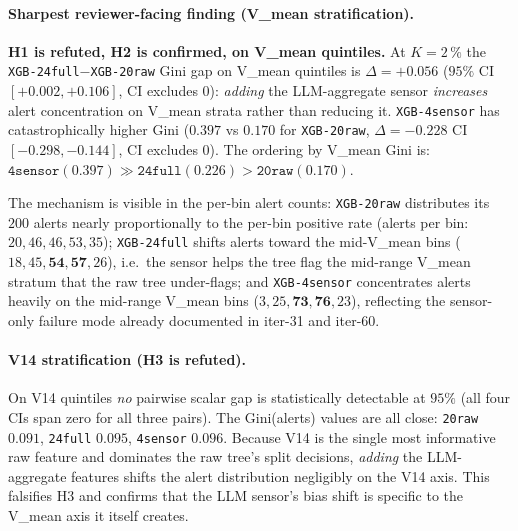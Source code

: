 \paragraph{Sharpest reviewer-facing finding (V\_mean stratification).}
\textbf{H1 is refuted, H2 is confirmed, on V\_mean quintiles.}
At $K{=}2\,\%$ the \texttt{XGB-24full}${-}$\texttt{XGB-20raw} Gini gap
on V\_mean quintiles is $\Delta = +0.056$ ($95\%$ CI $[+0.002, +0.106]$,
CI excludes 0): \emph{adding} the LLM-aggregate sensor \emph{increases}
alert concentration on V\_mean strata rather than reducing it.
\texttt{XGB-4sensor} has catastrophically higher Gini ($0.397$ vs
$0.170$ for \texttt{XGB-20raw}, $\Delta = -0.228$ CI $[-0.298, -0.144]$,
CI excludes 0). The ordering by V\_mean Gini is:
$\texttt{4sensor} (0.397) \gg \texttt{24full} (0.226) > \texttt{20raw}
(0.170)$.

The mechanism is visible in the per-bin alert counts:
\texttt{XGB-20raw} distributes its $200$ alerts nearly
proportionally to the per-bin positive rate (alerts per bin:
$20, 46, 46, 53, 35$);
\texttt{XGB-24full} shifts alerts toward the mid-V\_mean bins
($18, 45, \mathbf{54}, \mathbf{57}, 26$), i.e.\ the sensor helps
the tree flag the mid-range V\_mean stratum that the raw tree
under-flags; and \texttt{XGB-4sensor} concentrates alerts heavily on
the mid-range V\_mean bins ($3, 25, \mathbf{73}, \mathbf{76}, 23$),
reflecting the sensor-only failure mode already documented in iter-31
and iter-60.

\paragraph{V14 stratification (H3 is refuted).}
On V14 quintiles \emph{no} pairwise scalar gap is statistically detectable
at $95\%$ (all four CIs span zero for all three pairs). The
Gini(alerts) values are all close: \texttt{20raw} $0.091$,
\texttt{24full} $0.095$, \texttt{4sensor} $0.096$. Because V14 is the
single most informative raw feature and dominates the raw tree's split
decisions, \emph{adding} the LLM-aggregate features shifts the alert
distribution negligibly on the V14 axis. This falsifies H3 and confirms
that the LLM sensor's bias shift is specific to the V\_mean axis it
itself creates.

